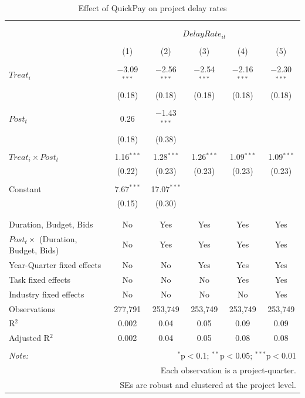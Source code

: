 \documentclass[
]{article}
\begin{document}
\begin{table}[H] \centering 
  \caption{Effect of QuickPay on project delay rates} 
  \label{} 
\small 
\begin{tabular}{@{\extracolsep{-2pt}}lccccc} 
\\[-1.8ex]\hline 
\hline \\[-1.8ex] 
\\[-1.8ex] & \multicolumn{5}{c}{$DelayRate_{it}$} \\ 
\\[-1.8ex] & (1) & (2) & (3) & (4) & (5)\\ 
\hline \\[-1.8ex] 
 $Treat_i$ & $-$3.09$^{***}$ & $-$2.56$^{***}$ & $-$2.54$^{***}$ & $-$2.16$^{***}$ & $-$2.30$^{***}$ \\ 
  & (0.18) & (0.18) & (0.18) & (0.18) & (0.18) \\ 
  & & & & & \\ 
 $Post_t$ & 0.26 & $-$1.43$^{***}$ &  &  &  \\ 
  & (0.18) & (0.38) &  &  &  \\ 
  & & & & & \\ 
 $Treat_i \times Post_t$ & 1.16$^{***}$ & 1.28$^{***}$ & 1.26$^{***}$ & 1.09$^{***}$ & 1.09$^{***}$ \\ 
  & (0.22) & (0.23) & (0.23) & (0.23) & (0.23) \\ 
  & & & & & \\ 
 Constant & 7.67$^{***}$ & 17.07$^{***}$ &  &  &  \\ 
  & (0.15) & (0.30) &  &  &  \\ 
  & & & & & \\ 
\hline \\[-1.8ex] 
Duration, Budget, Bids & No & Yes & Yes & Yes & Yes \\ 
$Post_t \times$  (Duration, Budget, Bids) & No & Yes & Yes & Yes & Yes \\ 
Year-Quarter fixed effects & No & No & Yes & Yes & Yes \\ 
Task fixed effects & No & No & No & Yes & Yes \\ 
Industry fixed effects & No & No & No & No & Yes \\ 
Observations & 277,791 & 253,749 & 253,749 & 253,749 & 253,749 \\ 
R$^{2}$ & 0.002 & 0.04 & 0.05 & 0.09 & 0.09 \\ 
Adjusted R$^{2}$ & 0.002 & 0.04 & 0.05 & 0.08 & 0.08 \\ 
\hline 
\hline \\[-1.8ex] 
\textit{Note:}  & \multicolumn{5}{r}{$^{*}$p$<$0.1; $^{**}$p$<$0.05; $^{***}$p$<$0.01} \\ 
 & \multicolumn{5}{r}{Each observation is a project-quarter.} \\ 
 & \multicolumn{5}{r}{SEs are robust and clustered at the project level.} \\ 
\end{tabular} 
\end{table}
\end{document}
